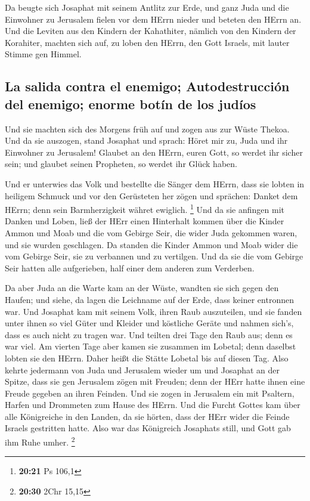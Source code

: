  Da beugte sich Josaphat mit seinem Antlitz zur Erde, und
ganz Juda und die Einwohner zu Jerusalem fielen vor dem HErrn nieder und
beteten den HErrn an.  Und die Leviten aus den Kindern
der Kahathiter, nämlich von den Kindern der Korahiter, machten sich auf,
zu loben den HErrn, den Gott Israels, mit lauter Stimme gen Himmel.

\hypertarget{la-salida-contra-el-enemigo-autodestrucciuxf3n-del-enemigo-enorme-botuxedn-de-los-juduxedos}{%
\subsection{La salida contra el enemigo; Autodestrucción del enemigo;
enorme botín de los
judíos}\label{la-salida-contra-el-enemigo-autodestrucciuxf3n-del-enemigo-enorme-botuxedn-de-los-juduxedos}}

 Und sie machten sich des Morgens früh auf und zogen aus
zur Wüste Thekoa. Und da sie auszogen, stand Josaphat und sprach: Höret
mir zu, Juda und ihr Einwohner zu Jerusalem! Glaubet an den HErrn, euren
Gott, so werdet ihr sicher sein; und glaubet seinen Propheten, so werdet
ihr Glück haben.

 Und er unterwies das Volk und bestellte die Sänger dem
HErrn, dass sie lobten in heiligem Schmuck und vor den Gerüsteten her
zögen und sprächen: Danket dem HErrn; denn sein Barmherzigkeit währet
ewiglich. \footnote{\textbf{20:21} Ps 106,1}  Und da sie
anfingen mit Danken und Loben, ließ der HErr einen Hinterhalt kommen
über die Kinder Ammon und Moab und die vom Gebirge Seir, die wider Juda
gekommen waren, und sie wurden geschlagen.  Da standen
die Kinder Ammon und Moab wider die vom Gebirge Seir, sie zu verbannen
und zu vertilgen. Und da sie die vom Gebirge Seir hatten alle
aufgerieben, half einer dem anderen zum Verderben.

 Da aber Juda an die Warte kam an der Wüste, wandten sie
sich gegen den Haufen; und siehe, da lagen die Leichname auf der Erde,
dass keiner entronnen war.  Und Josaphat kam mit seinem
Volk, ihren Raub auszuteilen, und sie fanden unter ihnen so viel Güter
und Kleider und köstliche Geräte und nahmen sich's, dass es auch nicht
zu tragen war. Und teilten drei Tage den Raub aus; denn es war viel.
 Am vierten Tage aber kamen sie zusammen im Lobetal; denn
daselbst lobten sie den HErrn. Daher heißt die Stätte Lobetal bis auf
diesen Tag.  Also kehrte jedermann von Juda und Jerusalem
wieder um und Josaphat an der Spitze, dass sie gen Jerusalem zögen mit
Freuden; denn der HErr hatte ihnen eine Freude gegeben an ihren Feinden.
 Und sie zogen in Jerusalem ein mit Psaltern, Harfen und
Drommeten zum Hause des HErrn.  Und die Furcht Gottes kam
über alle Königreiche in den Landen, da sie hörten, dass der HErr wider
die Feinde Israels gestritten hatte.  Also war das
Königreich Josaphats still, und Gott gab ihm Ruhe umher. \footnote{\textbf{20:30}
  2Chr 15,15}

